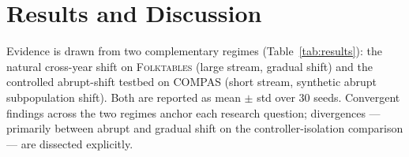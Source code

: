 \documentclass[sigconf,anonymous,review]{acmart}
\begin{document}
\section{Results and Discussion}
\label{sec:results}
Evidence is drawn from two complementary regimes (Table~\ref{tab:results}): the natural cross-year shift on \textsc{Folktables} (large stream, gradual
shift) and the controlled abrupt-shift testbed on \textsc{COMPAS} (short stream, synthetic abrupt subpopulation shift). Both are reported as mean
$\pm$ std over $30$ seeds. Convergent findings across the two regimes anchor each research question; divergences --- primarily between abrupt and gradual
shift on the controller-isolation comparison --- are dissected explicitly.

\begin{table}[!htbp]
\centering
\caption{Prequential results, mean $\pm$ std over $30$ seeds. \textbf{Bold} = best mean per metric within each dataset; superscripts on the \textsc{FADO} row = paired Wilcoxon Holm-corrected significance vs \emph{every} baseline at the indicated level ($^{*}p{<}0.05$, $^{**}p{<}0.01$, $^{***}p{<}0.001$). Columns with no \textsc{FADO} marker have mixed per-baseline directions and are dissected in the text.}
\label{tab:results}
\setlength{\tabcolsep}{3pt}
\end{table}
\end{document}
